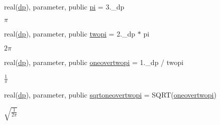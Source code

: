 \begin{DoxyCompactItemize}
\mbox{\label{namespaceconstants__pop_ad63fbcef2547f788cdc856b118322820}} 
real(\mbox{\hyperlink{namespaceconstants__pop_aa40e688cf9ef9b7cf0db05c80879ca15}{dp}}), parameter, public \mbox{\hyperlink{namespaceconstants__pop_ad63fbcef2547f788cdc856b118322820}{pi}} = 3.\+\_\+dp
\begin{DoxyCompactList}\small\item\em $\pi$ \end{DoxyCompactList}\item 
\mbox{\label{namespaceconstants__pop_ae43dedb6e19b862871cca993749be265}} 
real(\mbox{\hyperlink{namespaceconstants__pop_aa40e688cf9ef9b7cf0db05c80879ca15}{dp}}), parameter, public \mbox{\hyperlink{namespaceconstants__pop_ae43dedb6e19b862871cca993749be265}{twopi}} = 2.\+\_\+dp $\ast$ pi
\begin{DoxyCompactList}\small\item\em $2\pi$ \end{DoxyCompactList}\item 
\mbox{\label{namespaceconstants__pop_ac19ec58d8898ca8e5b8643eb5392e6de}} 
real(\mbox{\hyperlink{namespaceconstants__pop_aa40e688cf9ef9b7cf0db05c80879ca15}{dp}}), parameter, public \mbox{\hyperlink{namespaceconstants__pop_ac19ec58d8898ca8e5b8643eb5392e6de}{oneovertwopi}} = 1.\+\_\+dp / twopi
\begin{DoxyCompactList}\small\item\em $\frac{1}{\pi}$ \end{DoxyCompactList}\item 
\mbox{\label{namespaceconstants__pop_aaca1780ca726234138cb9e815a4222a1}} 
real(\mbox{\hyperlink{namespaceconstants__pop_aa40e688cf9ef9b7cf0db05c80879ca15}{dp}}), parameter, public \mbox{\hyperlink{namespaceconstants__pop_aaca1780ca726234138cb9e815a4222a1}{sqrtoneovertwopi}} = S\+Q\+RT(\mbox{\hyperlink{namespaceconstants__pop_ac19ec58d8898ca8e5b8643eb5392e6de}{oneovertwopi}})
\begin{DoxyCompactList}\small\item\em $\sqrt{\frac{1}{2\pi}}$ \end{DoxyCompactList}\item 
\mbox{\label{namespaceconstants__pop_a48d520b0575fa59982719ff96fb7fda9}} 

\end{DoxyCompactItemize}
